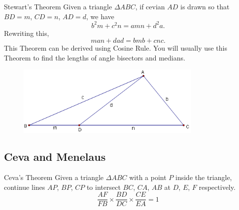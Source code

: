 \begin{thrm}{Stewart's Theorem}{} 
Given a triangle $\Delta ABC$, if cevian $AD$ is drawn so that $BD = m$, $CD = n$, $AD = d$, we have 
\[ b^2 m + c^2 n = amn + d^2 a.\] 
Rewriting this, 
\begin{equation} man + dad = bmb + cnc. \end{equation} 
This Theorem can be derived using Cosine Rule. You will usually use this Theorem to find the lengths of angle bisectors and medians. 
\end{thrm}

\begin{figure}[H]
    \centering
    \includegraphics[width=9cm]{images/Stewarts_theorem.png}
\end{figure}

\subsection{Ceva and Menelaus}
\begin{thrm}{Ceva's Theorem}{} 
Given a triangle $\Delta ABC $ with a point $P$ inside the triangle, continue lines $AP$, $BP$, $CP$ to intersect $BC$, $CA$, $AB$ at $D$, $E$, $F$ respectively. 
\begin{equation} \frac {AF}{FB} \times \frac {BD}{DC} \times \frac {CE}{EA} = 1 \end{equation} 
\end{thrm}

\begin{figure}[H]
    \centering
\end{figure}

